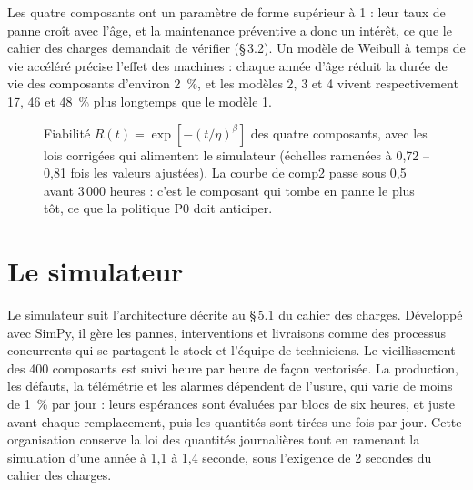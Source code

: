 \documentclass[11pt,a4paper,oneside]{report}
\begin{document}
Les quatre composants ont un paramètre de forme supérieur à 1 : leur taux de panne croît avec l'âge, et la maintenance préventive a donc un intérêt, ce que le cahier des charges demandait de vérifier (§\,3.2). Un modèle de Weibull à temps de vie accéléré précise l'effet des machines : chaque année d'âge réduit la durée de vie des composants d'environ 2~\%, et les modèles 2, 3 et 4 vivent respectivement 17, 46 et 48~\% plus longtemps que le modèle 1.

\begin{figure}[H]
\centering
{}
\caption{Fiabilité $R(t)=\exp[-(t/\eta)^{\beta}]$ des quatre composants, avec les lois corrigées qui alimentent le simulateur (échelles ramenées à 0,72 -- 0,81 fois les valeurs ajustées). La courbe de comp2 passe sous 0,5 avant 3\,000 heures : c'est le composant qui tombe en panne le plus tôt, ce que la politique P0 doit anticiper.}
\label{fig:weibull}
\end{figure}

\section{Le simulateur}\label{sec:simulateur}

Le simulateur suit l'architecture décrite au §\,5.1 du cahier des charges. Développé avec SimPy, il gère les pannes, interventions et livraisons comme des processus concurrents qui se partagent le stock et l'équipe de techniciens. Le vieillissement des 400 composants est suivi heure par heure de façon vectorisée. La production, les défauts, la télémétrie et les alarmes dépendent de l'usure, qui varie de moins de 1~\% par jour : leurs espérances sont évaluées par blocs de six heures, et juste avant chaque remplacement, puis les quantités sont tirées une fois par jour. Cette organisation conserve la loi des quantités journalières tout en ramenant la simulation d'une année à 1,1 à 1,4 seconde, sous l'exigence de 2 secondes du cahier des charges.
\end{document}
